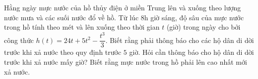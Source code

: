 \begin{ex}%
	Hằng ngày mực nước của hồ thủy điện ở miền Trung lên và xuống theo lượng nước mưa và các suối nước đổ về hồ. Từ lúc 8h giờ sáng, độ sâu của mực nước trong hồ tính theo mét và lên xuống theo thời gian $t$ (giờ) trong ngày cho bởi công thức $h\left(t\right)=24t+5t^2-\dfrac{t^3}{3}$. Biết rằng phải thông báo cho các hộ dân di dời trước khi xả nước theo quy định trước $5$ giờ. Hỏi cần thông báo cho hộ dân di dời trước khi xả nước mấy giờ? Biết rằng mực nước trong hồ phải lên cao nhất mới xả nước.
\end{ex}

